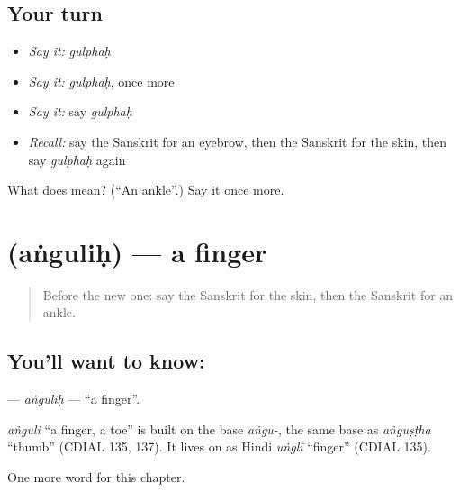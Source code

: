 \subsection*{Your turn}
\begin{itemize}
\raggedright
  \item \emph{Say it:} \emph{gulphaḥ}
  \item \emph{Say it:} \emph{gulphaḥ}, once more
  \item \emph{Say it:} say \emph{gulphaḥ}
  \item \emph{Recall:} say the Sanskrit for an eyebrow, then the Sanskrit for the skin, then say \emph{gulphaḥ} again
\end{itemize}

\begin{tcolorbox}[breakable,colback=teal!4,colframe=teal!35!black,title={Before you move on}]
What does  mean? (\textquotedblleft{}An ankle\textquotedblright{}.) Say it once more.
\end{tcolorbox}
\section[\texorpdfstring{\sk{अंगुलिः} (aṅguliḥ)}{अंगुलिः (aṅguliḥ)}]{ (aṅguliḥ) — a finger}

\label{lesson:SA-C118-angulih}



\begin{quote}
Before the new one: say the Sanskrit for the skin, then the Sanskrit for an ankle.
\end{quote}

\subsection*{You'll want to know: }
\textbf{} — \emph{aṅguliḥ} — \textquotedblleft{}a finger\textquotedblright{}.

\begin{cousinweb}
\emph{aṅguli} \textquotedblleft{}a finger, a toe\textquotedblright{} is built on the base \emph{aṅgu-}, the same base as \emph{aṅguṣṭha} \textquotedblleft{}thumb\textquotedblright{} (CDIAL 135, 137). It lives on as Hindi \emph{uṅglī} \textquotedblleft{}finger\textquotedblright{} (CDIAL 135).
\end{cousinweb}

\begin{grammarlens}[title={What you've built}]
One more word for this chapter.
\end{grammarlens}

